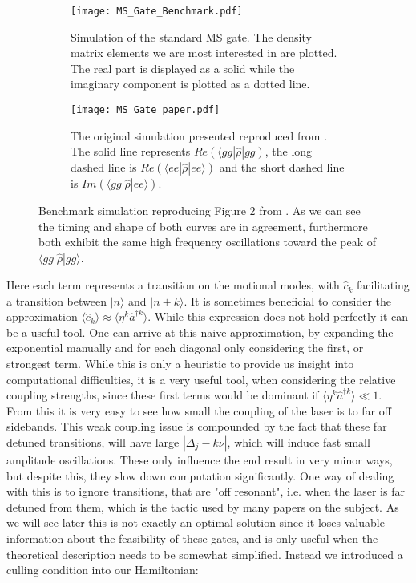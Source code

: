 \documentclass[12pt,twoside]{report}
\begin{document}
\begin{figure}[t!]
	\centering
	\begin{subfigure}[t]{0.475\textwidth}
		\centering
		\texttt{[image: MS\_Gate\_Benchmark.pdf]}
		\caption{Simulation of the standard MS gate. The density matrix elements we are most interested in are plotted. The real part is displayed as a solid while the imaginary component is plotted as a dotted line.}
		\label{fig:msbench:measured}
	\end{subfigure}
	\hfill
	\begin{subfigure}[t]{0.475\textwidth}
		\centering
		\texttt{[image: MS\_Gate\_paper.pdf]}
		\caption{The original simulation presented reproduced from \cite{MS_gate}. The solid line represents $Re\left(\langle gg|\hat{\rho}| gg\right)$, the long dashed line is $Re\left(\langle ee|\hat{\rho}|ee\rangle\right)$ and the short dashed line is $Im\left(\langle gg|\hat{\rho}|ee\rangle\right)$.}
		\label{fig:msbench:original}
	\end{subfigure}
	\caption[MS Gate benchmark]{Benchmark simulation reproducing Figure 2 from \cite{MS_gate}. As we can see the timing and shape of both curves are in agreement, furthermore both exhibit the same high frequency oscillations toward the peak of $\langle gg|\hat{\rho}|gg\rangle$.}
	\label{fig:msbench}
\end{figure}

Here each term represents a transition on the motional modes, with $\hat{c}_k$ facilitating a transition between $|n\rangle$ and $|n+k\rangle$. It is sometimes beneficial to consider the approximation $\langle\hat{c}_k\rangle\approx\langle\eta^k\hat{a}^{\dagger k}\rangle$. While this expression does not hold perfectly it can be a useful tool. One can arrive at this naive approximation, by expanding the exponential manually and for each diagonal only considering the first, or strongest term. While this is only a heuristic to provide us insight into computational difficulties, it is a very useful tool, when considering the relative coupling strengths, since these first terms would be dominant if $\langle\eta^k\hat{a}^{\dagger k}\rangle\ll 1$. From this it is very easy to see how small the coupling of the laser is to far off sidebands\cite{Charged_Particle_traps_Cooling}. This weak coupling issue is compounded by the fact that these far detuned transitions, will have large $|\Delta_j -k\nu|$, which will induce fast small amplitude oscillations. These only influence the end result in very minor ways, but despite this, they slow down computation significantly. One way of dealing with this is to ignore transitions, that are "off resonant", i.e. when the laser is far detuned from them, which is the tactic used by many papers on the subject\cite{Cardioid,MS_gate,Fast_MS,SC_Paper}. As we will see later this is not exactly an optimal solution since it loses valuable information about the feasibility of these gates, and is only useful when the theoretical description needs to be somewhat simplified. Instead we introduced a culling condition into our Hamiltonian:
\end{document}

